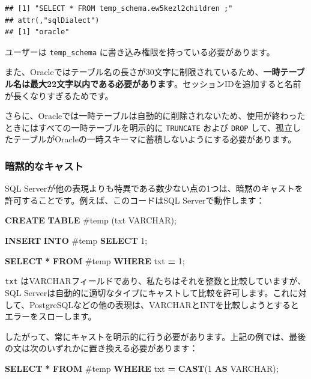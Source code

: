 \documentclass[
  11pt]{book}
\newenvironment{Shaded}{\begin{snugshade}}{\end{snugshade}}
\newcommand{\DataTypeTok}[1]{\textcolor[rgb]{0.13,0.29,0.53}{#1}}
\newcommand{\DecValTok}[1]{\textcolor[rgb]{0.00,0.00,0.81}{#1}}
\newcommand{\FunctionTok}[1]{\textcolor[rgb]{0.13,0.29,0.53}{\textbf{#1}}}
\newcommand{\KeywordTok}[1]{\textcolor[rgb]{0.13,0.29,0.53}{\textbf{#1}}}
\newcommand{\NormalTok}[1]{#1}
\newcommand{\OperatorTok}[1]{\textcolor[rgb]{0.81,0.36,0.00}{\textbf{#1}}}
\newcommand{\StringTok}[1]{\textcolor[rgb]{0.31,0.60,0.02}{#1}}
\theoremstyle{definition}
\theoremstyle{definition}
\theoremstyle{definition}
\theoremstyle{definition}
\theoremstyle{remark}
\begin{document}
\begin{verbatim}
## [1] "SELECT * FROM temp_schema.ew5kezl2children ;"
## attr(,"sqlDialect")
## [1] "oracle"
\end{verbatim}

ユーザーは \texttt{temp\_schema} に書き込み権限を持っている必要があります。

また、Oracleではテーブル名の長さが30文字に制限されているため、\textbf{一時テーブル名は最大22文字以内である必要があります}。セッションIDを追加すると名前が長くなりすぎるためです。

さらに、Oracleでは一時テーブルは自動的に削除されないため、使用が終わったときにはすべての一時テーブルを明示的に \texttt{TRUNCATE} および \texttt{DROP} して、孤立したテーブルがOracleの一時スキーマに蓄積しないようにする必要があります。

\subsubsection*{暗黙的なキャスト}\label{ux6697ux9ed9ux7684ux306aux30adux30e3ux30b9ux30c8}

SQL Serverが他の表現よりも特異である数少ない点の1つは、暗黙のキャストを許可することです。例えば、このコードはSQL Serverで動作します：

\begin{Shaded}
\begin{Highlighting}[]
\KeywordTok{CREATE} \KeywordTok{TABLE}\NormalTok{ \#temp (txt }\DataTypeTok{VARCHAR}\NormalTok{);}

\KeywordTok{INSERT} \KeywordTok{INTO}\NormalTok{ \#temp}
\KeywordTok{SELECT} \StringTok{\textquotesingle{}1\textquotesingle{}}\NormalTok{;}

\KeywordTok{SELECT} \OperatorTok{*} \KeywordTok{FROM}\NormalTok{ \#temp }\KeywordTok{WHERE}\NormalTok{ txt }\OperatorTok{=} \DecValTok{1}\NormalTok{;}
\end{Highlighting}
\end{Shaded}

\texttt{txt} はVARCHARフィールドであり、私たちはそれを整数と比較していますが、SQL Serverは自動的に適切なタイプにキャストして比較を許可します。これに対して、PostgreSQLなどの他の表現は、VARCHARとINTを比較しようとするとエラーをスローします。

したがって、常にキャストを明示的に行う必要があります。上記の例では、最後の文は次のいずれかに置き換える必要があります：

\begin{Shaded}
\begin{Highlighting}[]
\KeywordTok{SELECT} \OperatorTok{*} \KeywordTok{FROM}\NormalTok{ \#temp }\KeywordTok{WHERE}\NormalTok{ txt }\OperatorTok{=} \FunctionTok{CAST}\NormalTok{(}\DecValTok{1} \KeywordTok{AS} \DataTypeTok{VARCHAR}\NormalTok{);}
\end{Highlighting}
\end{Shaded}
\end{document}
